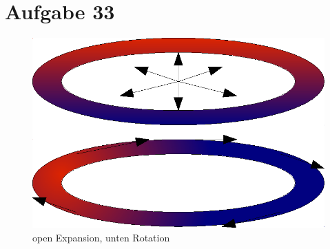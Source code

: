 \section{Aufgabe 33}
\begin{figure}[ht]
\begin{center}
\includegraphics[scale=1]{skizzeaufgabe33}
\end{center}
\caption[Bildunterschrift]{open Expansion, unten Rotation}
\end{figure}
